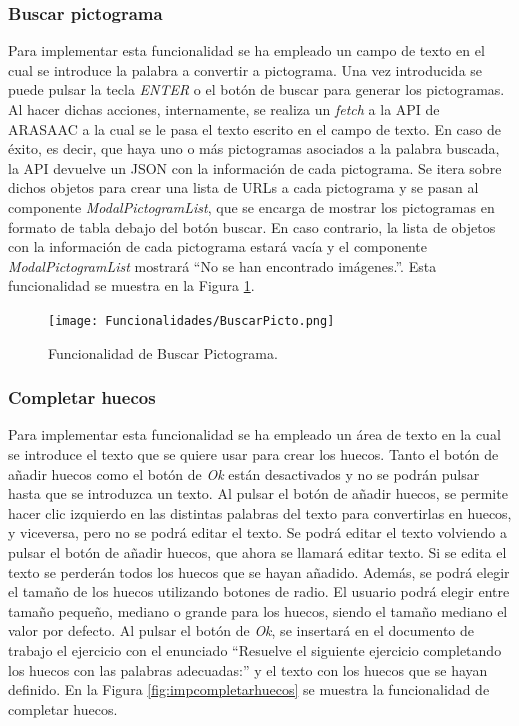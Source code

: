 \subsubsection{Buscar pictograma}
\label{sec:impbuscarpicto}
Para implementar esta funcionalidad se ha empleado un campo de texto en el cual se introduce la palabra a convertir a pictograma. Una vez introducida se puede pulsar la tecla \textit{ENTER} o el botón de buscar para generar los pictogramas. Al hacer dichas acciones, internamente, se realiza un \textit{fetch} a la API de ARASAAC a la cual se le pasa el texto escrito en el campo de texto. En caso de éxito, es decir, que haya uno o más pictogramas asociados a la palabra buscada, la API devuelve un JSON con la información de cada pictograma. Se itera sobre dichos objetos para crear una lista de URLs a cada pictograma y se pasan al componente \textit{ModalPictogramList}, que se encarga de mostrar los pictogramas en formato de tabla debajo del botón buscar. En caso contrario, la lista de objetos con la información de cada pictograma estará vacía y el componente \textit{ModalPictogramList} mostrará ``No se han encontrado imágenes.''. Esta funcionalidad se muestra en la Figura \ref{fig:buscarPictograma}.

\begin{figure}[ht!]
  \centering
  \texttt{[image: Funcionalidades/BuscarPicto.png]}
  \caption{Funcionalidad de Buscar Pictograma.}
  \label{fig:buscarPictograma}
\end{figure}

\subsubsection{Completar huecos}
\label{sec:impcompletarhuecos}
Para implementar esta funcionalidad se ha empleado un área de texto en la cual se introduce el texto que se quiere usar para crear los huecos. Tanto el botón de añadir huecos como el botón de \textit{Ok} están desactivados y no se podrán pulsar hasta que se introduzca un texto. Al pulsar el botón de añadir huecos, se permite hacer clic izquierdo en las distintas palabras del texto para convertirlas en huecos, y viceversa, pero no se podrá editar el texto. Se podrá editar el texto volviendo a pulsar el botón de añadir huecos, que ahora se llamará editar texto. Si se edita el texto se perderán todos los huecos que se hayan añadido. Además, se podrá elegir el tamaño de los huecos utilizando botones de radio. El usuario podrá elegir entre tamaño pequeño, mediano o grande para los huecos, siendo el tamaño mediano el valor por defecto. Al pulsar el botón de \textit{Ok}, se insertará en el documento de trabajo el ejercicio con el enunciado ``Resuelve el siguiente ejercicio completando los huecos con las palabras adecuadas:'' y el texto con los huecos que se hayan definido. En la Figura \ref{fig:impcompletarhuecos} se muestra la funcionalidad de completar huecos.

